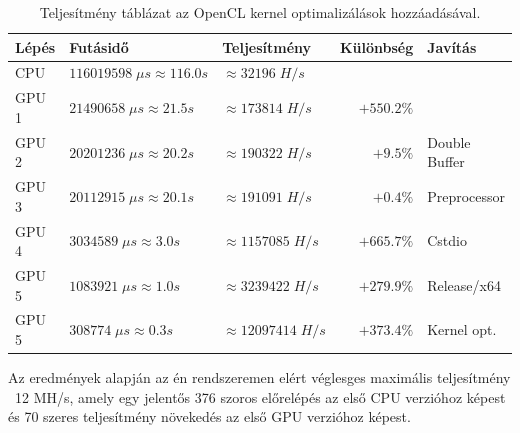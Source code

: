 \begin{table}[H]
    \centering
    \begin{tabular}{l|l|l|r|l}
        \textbf{Lépés} & \textbf{Futásidő} & \textbf{Teljesítmény} & \textbf{Különbség} & \textbf{Javítás} \\
        \hline
        \hline
        
        CPU & $\num{116 019 598} \; \mu s \approx \num{116.0}s $ & $\approx \num{32 196} \; H/s$ & & \\
        \hline
                            
        GPU 1 & $\num{21 490 658} \; \mu s \approx \num{21.5}s $ & $\approx \num{173 814} \; H/s$ & $+550.2\%$ & \\
        \hline
        
        GPU 2 & $\num{20 201 236} \; \mu s \approx \num{20.2}s $ & $\approx \num{190 322} \; H/s$ & $+9.5\%$ & Double Buffer \\
        \hline
        
        GPU 3 & $\num{20 112 915} \; \mu s \approx \num{20.1}s $ & $\approx \num{191 091} \; H/s$ & $+0.4\%$ & Preprocessor \\
        \hline
        
        GPU 4 & $\num{3 034 589} \; \mu s \approx \num{3.0}s $ & $\approx \num{1 157 085} \; H/s$ & $+665.7\%$ & Cstdio \\
        \hline
        
        GPU 5 & $\num{1 083 921} \; \mu s \approx \num{1.0}s $ & $\approx \num{3 239 422} \; H/s$ & $+279.9\%$ & Release/x64 \\
        \hline
        
        GPU 5 & $\num{308 774} \; \mu s \approx \num{0.3}s $ & $\approx \num{12 097 414} \; H/s$ & $+373.4\%$ & Kernel opt. \\
        
    \end{tabular}
    \caption{Teljesítmény táblázat az OpenCL kernel optimalizálások hozzáadásával.}
\end{table}

Az eredmények alapján az én rendszeremen elért véglesges maximális teljesítmény ~12 MH/s, amely egy jelentős 376 szoros előrelépés az első CPU verzióhoz képest és 70 szeres teljesítmény növekedés az első GPU verzióhoz képest.


